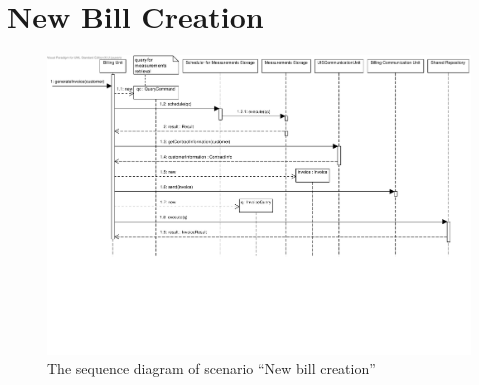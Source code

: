 \section{New Bill Creation}
\label{scenario:bill-creation}

\begin{figure}[H]
	\begin{centering}
		\includegraphics[width=\textwidth]{figs/scenario-5-13.pdf}
		\caption{The sequence diagram of scenario ``New bill creation''}
		\label{fig:scenario-5-14}
	\end{centering}
\end{figure}
